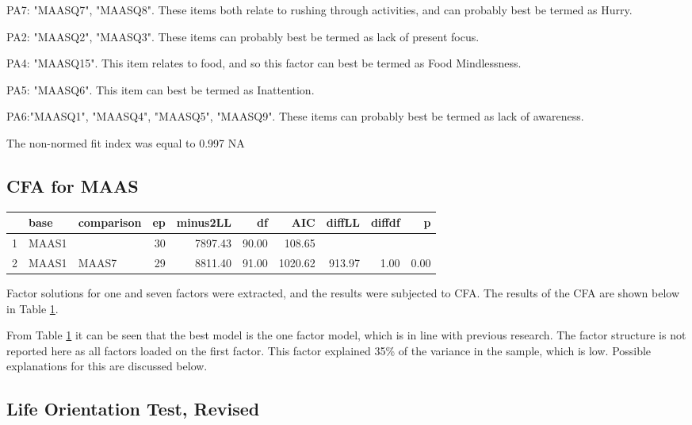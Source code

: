\documentclass{article}
\begin{document}
PA7: "MAASQ7", "MAASQ8". These items both relate to rushing through activities, and can probably best be termed as Hurry. 

PA2: "MAASQ2", "MAASQ3". These items can probably best be termed as lack of present focus.

PA4: "MAASQ15". This item relates to food, and so this factor can best be termed as Food Mindlessness. 

PA5: "MAASQ6". This item can best be termed as Inattention.

PA6:"MAASQ1", "MAASQ4", "MAASQ5", "MAASQ9". These items can probably best be termed as lack of awareness. 

The non-normed fit index was equal to 0.997
NA




\subsection{CFA for MAAS}
\label{sec:cfa-maas}






\begin{table}[ht]
\centering
\begin{tabular}{rllrrrrrrr}
  \hline
 & base & comparison & ep & minus2LL & df & AIC & diffLL & diffdf & p \\ 
  \hline
1 & MAAS1 &  &  30 & 7897.43 & 90.00 & 108.65 &  &  &  \\ 
  2 & MAAS1 & MAAS7 &  29 & 8811.40 & 91.00 & 1020.62 & 913.97 & 1.00 & 0.00 \\ 
   \hline
\end{tabular}
\label{tab:maassemcomp}
\end{table}
Factor solutions for one and seven factors were extracted, and the results were subjected to CFA.
The results of the CFA are shown below in Table \ref{tab:maassemcomp}.

From Table \ref{tab:maassemcomp} it can be seen that the best model is the one factor model, which is in line with previous research.
The factor structure is not reported here as all factors loaded on the first factor.  This factor explained 35\% of the variance
in the sample, which is low.  Possible explanations for this are discussed below. 
\subsection{Life Orientation Test, Revised}
\end{document}
